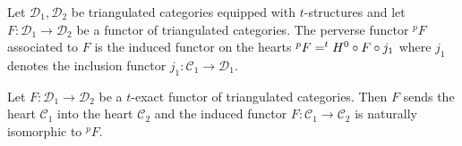 \begin{definition}
 Let $\mathcal{D}_1,\mathcal{D}_2$ be triangulated categories equipped with $t$-structures and let $F:\mathcal{D}_1 \to \mathcal{D}_2$ be a functor of triangulated categories.
 The perverse functor $^pF$ associated to $F$ is the induced functor on the hearts $^pF = ^tH^0 \circ F \circ j_1$ where $j_1$ denotes the inclusion functor $j_1:\mathcal{C}_1\to \mathcal{D}_1$.
\end{definition}
\begin{proposition}{\cite[Proposition 5.1.9.]{dimca2004sheaves}}\label{prop: FunctorHeart}
  Let $F:\mathcal{D}_1 \to \mathcal{D}_2$ be a $t$-exact functor of triangulated categories. Then $F$ sends the heart $\mathcal{C}_1$ into the heart $\mathcal{C}_2$ and the induced functor $F:\mathcal{C}_1 \to \mathcal{C}_2$ is naturally isomorphic to $^pF$.
\end{proposition}
